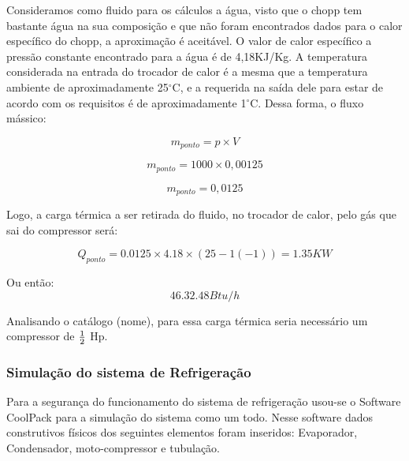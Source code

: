             Consideramos como fluido para os cálculos a água, visto que o chopp tem bastante 
            água na sua composição e que não foram encontrados dados para o calor específico 
            do chopp, a aproximação é aceitável. O valor de calor específico a pressão constante
            encontrado para a água é de 4,18KJ/Kg. A temperatura considerada na entrada do 
            trocador de calor é a mesma que a temperatura ambiente de aproximadamente 25$^\circ$C,
            e a requerida na saída dele para estar de acordo com os requisitos é de
            aproximadamente 1$^\circ$C. Dessa forma, o fluxo mássico:

            \begin{equation}
                m_{ponto} = p \times V
            \end{equation}

            \begin{equation}
                m_{ponto} = 1000 \times 0,00125
            \end{equation}

            \begin{equation}
                m_{ponto} = 0,0125
            \end{equation}

            Logo, a carga térmica a ser retirada do fluido, no trocador de calor,
            pelo gás que sai do compressor será:
            
            \begin{equation}
                Q_{ponto} = 0.0125 \times 4.18 \times (25-1(-1)) = 1.35 KW
            \end{equation}

            Ou então:
            \begin{equation}
                46.32.48 Btu/h
            \end{equation}

            Analisando o catálogo (nome), para essa carga térmica seria necessário um compressor de
            $1 \over 2$ Hp.

            \subsubsection[Simulação do sistema de Refrigeração]{Simulação do sistema de Refrigeração}
                Para a segurança do funcionamento do sistema de refrigeração usou-se o
                Software CoolPack para a simulação do sistema como um todo. Nesse
                software dados construtivos físicos dos seguintes elementos foram inseridos: 
                Evaporador, Condensador, moto-compressor e tubulação. 

